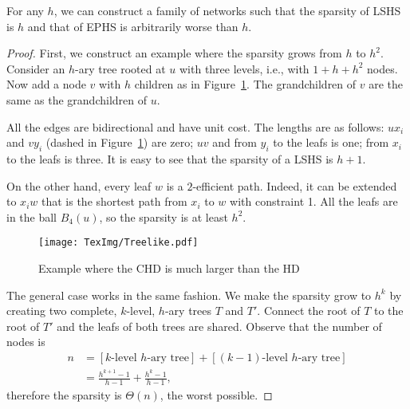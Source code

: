 \begin{proposition}\label{prop:treelike}
For any $h$, we can construct a family of networks such that the sparsity of LSHS is $h$ and that of EPHS is arbitrarily worse than $h$.
\end{proposition}
\begin{proof}
First, we construct an example where the sparsity grows from $h$ to $h^2$.
Consider an $h$-ary tree rooted at $u$ with three levels, i.e., with $1+h+h^2$ nodes.
Now add a node $v$ with $h$ children as in Figure~\ref{fig:treelike}. 
The grandchildren of $v$ are the same as the grandchildren of $u$.

All the edges are bidirectional and have unit cost.
The lengths are as follows: $ux_i$ and $vy_i$ (dashed in Figure~\ref{fig:treelike}) are zero; $uv$ and from $y_i$ to the leafs is one; from $x_i$ to the leafs is three.
It is easy to see that the sparsity of a LSHS is $h+1$.

On the other hand, every leaf $w$ is a $2$-efficient path.
Indeed, it can be extended to $x_iw$ that is the shortest path from $x_i$ to $w$ with constraint 1.
All the leafs are in the ball $B_4(u)$, so the sparsity is at least $h^2$.

\begin{figure}
\caption{Example where the CHD is much larger than the HD}
\label{fig:treelike}
\centering
\texttt{[image: TexImg/Treelike.pdf]}
\end{figure}

The general case works in the same fashion.
We make the sparsity grow to $h^k$ by creating two complete, $k$-level, $h$-ary trees $T$ and $T'$.
Connect the root of $T$ to the root of $T'$ and the leafs of both trees are shared.
Observe that the number of nodes is 
\begin{align*}
n &=[\text{$k$-level $h$-ary tree}] + [\text{$(k-1)$-level $h$-ary tree}]\\
&= \frac{h^{k+1}-1}{h-1} + \frac{h^k-1}{h-1},
\end{align*}
therefore the sparsity is $\Theta(n)$, the worst possible.
\end{proof}